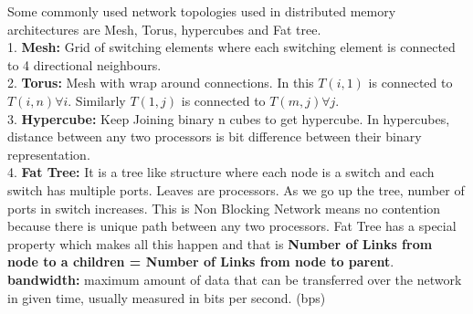 \documentclass{article}
\begin{document}
Some commonly used network topologies used in distributed memory architectures are Mesh, Torus, hypercubes and Fat tree. \\

1. \textbf{Mesh:} Grid of switching elements where each switching element is connected to 4 directional neighbours. \\
2. \textbf{Torus:} Mesh with wrap around connections. In this $T(i,1)$ is connected to $T(i,n) \forall i$. Similarly $T(1,j)$ is connected to $T(m,j) \forall j$. \\ 
3. \textbf{Hypercube:} Keep Joining binary n cubes to get hypercube. In hypercubes, distance between any two processors is bit difference between their binary representation. \\
4. \textbf{Fat Tree:} It is a tree like structure where each node is a switch and each switch has multiple ports. Leaves are processors. As we go up the tree, number of ports in switch increases. This is Non Blocking Network means no contention because there is unique path between any two processors. Fat Tree has a special property which makes all this happen and that is \textbf{Number of Links from node to a children = Number of Links from node to parent}. \\

\textbf{bandwidth: } maximum amount of data that can be transferred over the network in given time, usually measured in bits per second. (bps) 

\newpage
\end{document}
